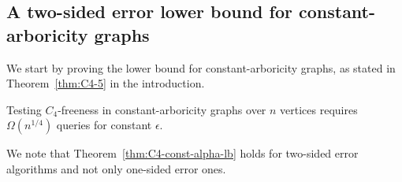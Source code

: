 
\subsection{A two-sided error lower bound for constant-arboricity graphs}
We start by proving the lower bound for constant-arboricity graphs, as stated in Theorem~\ref{thm:C4-5} in the introduction.

\begin{theorem} \label{thm:C4-const-alpha-lb}
Testing $C_4$-freeness in constant-arboricity graphs over $n$ vertices requires $\Omega(n^{1/4})$ queries for constant $\epsilon$.
\end{theorem}
We note that Theorem~\ref{thm:C4-const-alpha-lb} holds for two-sided error algorithms and not only one-sided error ones.

